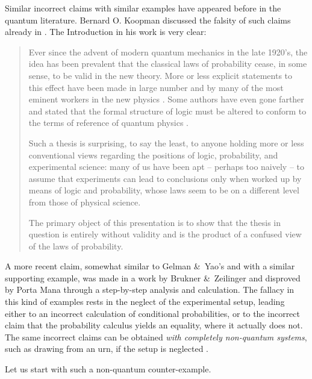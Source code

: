 \documentclass[\ifafour a4paper,12pt,\else a5paper,10pt,\fi%
onecolumn,oneside,article,%
british%
]{memoir}
\theoremstyle{remark}
\theoremstyle{innote}
\newcommand*{\citep}{\parencites}%
\newcommand*{\citey}{\parencites*}
\newcommand*{\amp}{\&}
\renewcommand*{\|}[1][]{\nonscript\,#1\vert\nonscript\;\mathopen{}}
\newcommand*{\sect}{\S}%
\begin{document}
Similar incorrect claims with similar examples have appeared before in the
quantum literature. Bernard O. Koopman \citep[of the Pitman-Koopman
theorem for sufficient statistics,][]{koopman1936} discussed the
falsity of such claims already in \cite*{koopman1957}. The Introduction in
his work is very clear:
\begin{quotation}\footnotesize
  Ever since the advent of modern quantum mechanics in the late
  1920's, the idea has been prevalent that the classical laws of
  probability cease, in some sense, to be valid in the new theory. More or
  less explicit statements to this effect have been made in large number
  and by many of the most eminent workers in the new physics \textelp{}.
  Some authors have even gone farther and stated that the formal structure
  of logic must be altered to conform to the terms of reference of quantum
  physics \textelp{}.

  Such a thesis is surprising, to say the least, to anyone holding more or
  less conventional views regarding the positions of logic, probability,
  and experimental science: many of us have been apt -- perhaps too naively
  -- to assume that experiments can lead to conclusions only when worked up
  by means of logic and probability, whose laws seem to be on a different
  level from those of physical science.

  The primary object of this presentation is to show that the thesis in
  question is entirely without validity and is the product of a confused
  view of the laws of probability.
\end{quotation}

A more recent claim, somewhat similar to Gelman \amp\ Yao's and with a
similar supporting example, was made in a work by Brukner \amp\ Zeilinger
\citey{brukneretal2001} and disproved by Porta Mana
\citey{portamana2003_r2004} through a step-by-step analysis and
calculation.
The fallacy in this kind of examples rests in the neglect of the
experimental setup, leading either to an incorrect calculation of
conditional probabilities, or to the incorrect claim that the probability
calculus yields an equality, where it actually does not. The same incorrect
claims can be obtained \emph{with completely non-quantum systems}, such as
drawing from an urn, if the setup is neglected
\citep[\sect~IV]{portamana2003_r2004}.

Let us start with such a non-quantum counter-example.
\end{document}
